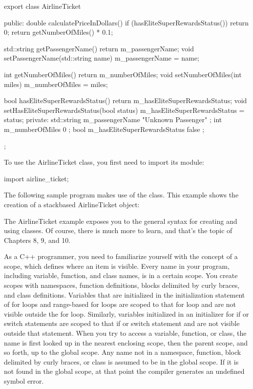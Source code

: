 \begin{cpp}
export class AirlineTicket
{
    public:
        double calculatePriceInDollars()
        {
            if (hasEliteSuperRewardsStatus()) { return 0; }
            return getNumberOfMiles() * 0.1;
        }

        std::string getPassengerName() { return m_passengerName; }
        void setPassengerName(std::string name) { m_passengerName = name; }

        int getNumberOfMiles() { return m_numberOfMiles; }
        void setNumberOfMiles(int miles) { m_numberOfMiles = miles; }

        bool hasEliteSuperRewardsStatus() { return m_hasEliteSuperRewardsStatus; }
        void setHasEliteSuperRewardsStatus(bool status)
        {
            m_hasEliteSuperRewardsStatus = status;
        }
    private:
        std::string m_passengerName { "Unknown Passenger" };
        int m_numberOfMiles { 0 };
        bool m_hasEliteSuperRewardsStatus { false };
};
\end{cpp}


To use the AirlineTicket class, you first need to import its module:

\begin{cpp}
import airline_ticket;
\end{cpp}

The following sample program makes use of the class. This example shows the creation of a stackbased AirlineTicket object:


The AirlineTicket example exposes you to the general syntax for creating and using classes. Of course, there is much more to learn, and that’s the topic of Chapters 8, 9, and 10.


As a C++ programmer, you need to familiarize yourself with the concept of a scope, which defines where an item is visible. Every name in your program, including variable, function, and class names, is in a certain scope. You create scopes with namespaces, function definitions, blocks delimited by curly braces, and class definitions. Variables that are initialized in the initialization statement of for loops and range-based for loops are scoped to that for loop and are not visible outside the for loop. Similarly, variables initialized in an initializer for if or switch statements are scoped to that if or switch statement and are not visible outside that statement. When you try to access a variable, function, or class, the name is first looked up in the nearest enclosing scope, then the parent scope, and so forth, up to the global scope. Any name not in a namespace, function, block delimited by curly braces, or class is assumed to be in the global scope. If it is not found in the global scope, at that point the compiler generates an undefined symbol error.

